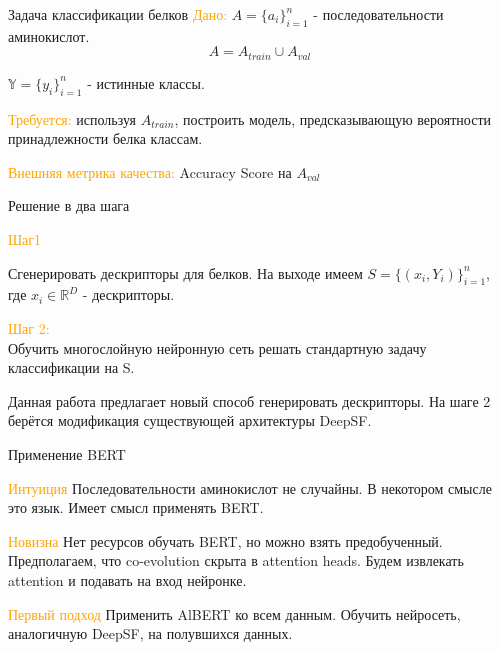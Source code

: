 \documentclass{beamer}
\begin{document}
\begin{frame}{Задача классификации белков}
\textcolor{orange}{Дано:}  $A = \{a_i \}_{i = 1}^n$ - последовательности аминокислот. 
$$A = A_{train} \cup A_{val}$$ 

$\mathbb{Y} = \{y_i\}_{i = 1}^n$ - истинные классы.

\bigskip

\textcolor{orange}{Требуется:} используя  $A_{train}$, построить модель, предсказывающую вероятности принадлежности белка классам.

\bigskip

\textcolor{orange}{Внешняя метрика качества:} Accuracy Score на $A_{val}$

\end{frame}

\begin{frame}{Решение в два шага}

\begin{block}{\textcolor{orange}{Шаг1}}

 Сгенерировать дескрипторы для белков. На выходе имеем $S = \{ (x_i, Y_i)\}_{i = 1}^n$, где $x_i \in \mathbb{R}^D$ - дескрипторы.

\end{block}
\textcolor{orange}{Шаг 2:} \\Обучить многослойную нейронную сеть решать стандартную задачу классификации на S.

\bigskip

Данная работа предлагает новый способ генерировать дескрипторы.  На шаге 2 берётся модификация существующей архитектуры DeepSF.
\end{frame}


\begin{frame}{Применение BERT}

\begin{block}{\textcolor{orange}{Интуиция}}
Последовательности аминокислот не случайны. В некотором смысле это язык. Имеет смысл применять BERT. 

\end{block}
\begin{block}{\textcolor{orange}{Новизна}}
Нет ресурсов обучать BERT, но можно взять предобученный. Предполагаем, что co-evolution скрыта в attention heads. Будем извлекать attention и подавать на вход нейронке.  

\end{block}

\begin{block}{\textcolor{orange}{Первый подход}}
Применить AlBERT ко всем данным. Обучить нейросеть, аналогичную DeepSF, на полувшихся данных.

\end{block}
\end{frame}
\end{document}

